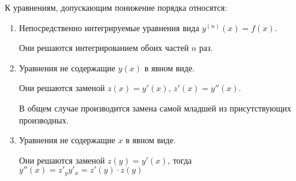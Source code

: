 
К уравнениям, допускающим понижение порядка относятся:

\begin{enumerate}
  \item Непосредственно интегрируемые уравнения вида \(y^{(n)}(x) = f(x)\).
  
  Они решаются интегрированием обоих частей \(n\) раз.

  \item Уравнения не содержащие \(y(x)\) в явном виде.
  
  Они решаются заменой \(z(x) = y'(x)\), \(z'(x) = y''(x)\).

  \begin{remark}
    В общем случае производится замена самой младшей из присутствующих
    производных.
  \end{remark}

  \item Уравнения не содержащие \(x\) в явном виде.
  
  Они решаются заменой \(z(y) = y'(x)\), тогда
  \(y''(x) = z'_{y} y'_{x} = z'(y) \cdot z(y)\)
\end{enumerate}